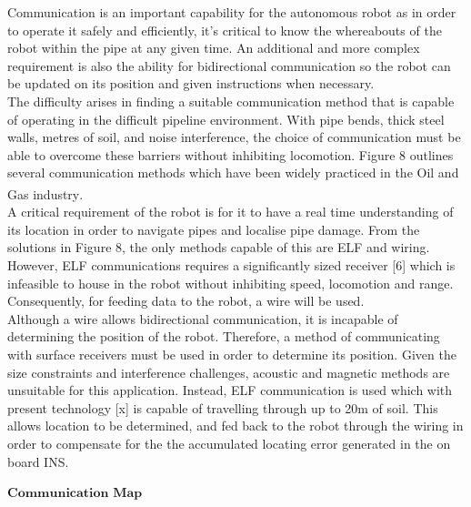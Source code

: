 \documentclass[11pt]{article}		%
\begin{document}
		Communication is an important capability for the autonomous robot as in order to operate it safely and efficiently, it's critical to know the whereabouts of the robot within the pipe at any given time. 
		An additional and more complex requirement is also the ability for bidirectional communication so the robot can be updated on its position and given instructions when necessary. 
		\\
	    The difficulty arises in finding a suitable communication method that is capable of operating in the difficult pipeline environment. 
	    With pipe bends, thick steel walls, metres of soil, and noise interference, the choice of communication must be able to overcome these barriers without inhibiting locomotion. 
	    Figure 8 outlines several communication methods which have been widely practiced in the Oil and Gas industry\textsuperscript{\cite{acoustic2020}}. %
	    \\
     	A critical requirement of the robot is for it to have a real time understanding of its location in order to navigate pipes and localise pipe damage. 
     	From the solutions in Figure 8, the only methods capable of this are ELF and wiring. 
     	However, ELF communications requires a significantly sized receiver [6] which is infeasible to house in the robot without inhibiting speed, locomotion and range. 
     	Consequently, for feeding data to the robot, a wire will be used.
        \\ 
        \hspace*{3ex}Although a wire allows bidirectional communication, it is incapable of determining the position of the robot. 
        Therefore, a method of communicating with surface receivers must be used in order to determine its position. 
        Given the size constraints and interference challenges, acoustic and magnetic methods are unsuitable for this application. 
        Instead, ELF communication is used which with present technology [x] is capable of travelling through up to 20m of soil. 
        This allows location to be determined, and fed back to the robot through the wiring in order to compensate for the the accumulated locating error generated in the on board INS.
         
        $\textbf{Communication Map}$
        
\end{document}
